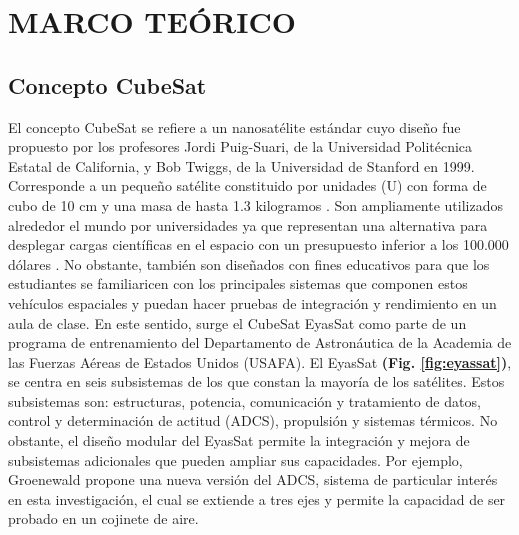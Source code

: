 \newpage
%

\newpage
\section{MARCO TEÓRICO}

\subsection{Concepto CubeSat}
El concepto CubeSat se refiere a un nanosatélite estándar cuyo diseño fue propuesto por los profesores Jordi Puig-Suari, de la Universidad Politécnica Estatal de California, y Bob Twiggs, de la Universidad de Stanford en 1999. Corresponde a un pequeño satélite constituido por unidades (U) con forma de cubo de 10 cm y una masa de hasta 1.3 kilogramos \cite{Lan2013}. Son ampliamente utilizados alrededor el mundo por universidades ya que representan una alternativa para desplegar cargas científicas en el espacio con un presupuesto inferior a los 100.000 dólares \cite{opc:Satcatalog}. 
No obstante, también son diseñados con fines educativos para que los estudiantes se familiaricen con los principales sistemas que componen estos vehículos espaciales y puedan hacer pruebas de integración y rendimiento en un aula de clase. En este sentido, surge el CubeSat EyasSat \cite{Barnhart2005} como parte de un programa de entrenamiento del Departamento de Astronáutica de la Academia de las Fuerzas Aéreas de Estados Unidos (USAFA). El EyasSat \textbf{(Fig. \ref{fig:eyassat})}, se centra en seis subsistemas de los que constan la mayoría de los satélites. Estos subsistemas son: estructuras, potencia, comunicación y tratamiento de datos, control y determinación de actitud (ADCS), propulsión y sistemas térmicos. No obstante, el diseño modular del EyasSat permite la integración y mejora de subsistemas adicionales que pueden ampliar sus capacidades. Por ejemplo, Groenewald\cite{Groenewald2014} propone una nueva versión del ADCS, sistema de particular interés en esta investigación, el cual se extiende a tres ejes y permite la capacidad de ser probado en un cojinete de aire.


